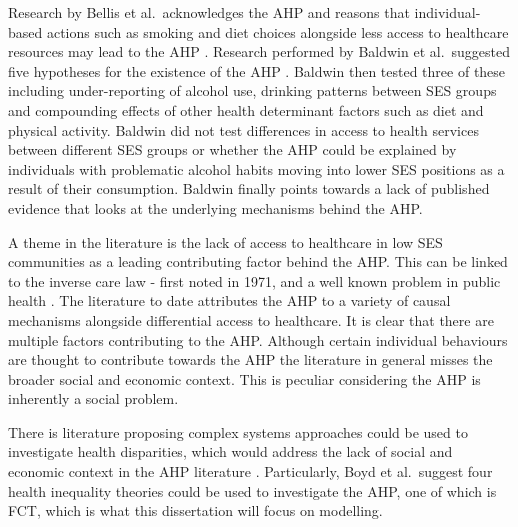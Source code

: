 Research by Bellis et al.~acknowledges the \ac{AHP} and reasons that individual-based actions such as smoking and diet choices alongside less access to healthcare resources may lead to the \ac{AHP} \cite{ahp2016}. Research performed by Baldwin et al.~suggested five hypotheses for the existence of the \ac{AHP} \cite{ahpInterventions}. Baldwin then tested three of these including under-reporting of alcohol use, drinking patterns between \ac{SES} groups and compounding effects of other health determinant factors such as diet and physical activity. Baldwin did not test differences in access to health services between different \ac{SES} groups or whether the \ac{AHP} could be explained by individuals with problematic alcohol habits moving into lower \ac{SES} positions as a result of their consumption. Baldwin finally points towards a lack of published evidence that looks at the underlying mechanisms behind the \ac{AHP}. 
\pagebreak

A theme in the literature is the lack of access to healthcare in low \ac{SES} communities as a leading contributing factor behind the \ac{AHP}. This can be linked to the inverse care law - first noted in 1971, and a well known problem in public health \cite{inverseCareLaw}. The literature to date attributes the \ac{AHP} to a variety of causal mechanisms alongside differential access to healthcare. It is clear that there are multiple factors contributing to the \ac{AHP}. Although certain individual behaviours are thought to contribute towards the \ac{AHP} the literature in general misses the broader social and economic context. This is peculiar considering the \ac{AHP} is inherently a social problem.

There is literature proposing complex systems approaches could be used to investigate health disparities, which would address the lack of social and economic context in the \ac{AHP} literature \cite{csHealthDisparities, Boyd2021}. Particularly, Boyd et al.~suggest four health inequality theories could be used to investigate the \ac{AHP}, one of which is \ac{FCT}, which is what this dissertation will focus on modelling\cite{Boyd2021}. 






